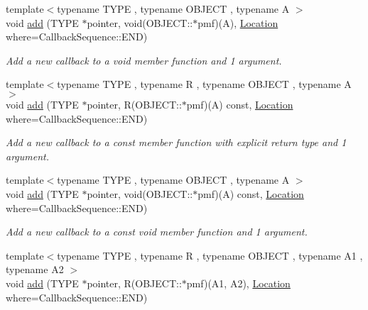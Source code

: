 \begin{DoxyCompactItemize}
{\footnotesize template$<$typename TYPE , typename OBJECT , typename A $>$ }\\void \hyperlink{struct_d_d4hep_1_1_callback_sequence_a193702d2e926545fcd103cab1fb2d37c}{add} (TYPE $\ast$pointer, void(OBJECT::$\ast$pmf)(A), \hyperlink{struct_d_d4hep_1_1_callback_sequence_a7753490247479633aed16a2376821ef7}{Location} where=CallbackSequence::END)
\begin{DoxyCompactList}\small\item\em Add a new callback to a void member function and 1 argument. \item\end{DoxyCompactList}\item 
{\footnotesize template$<$typename TYPE , typename R , typename OBJECT , typename A $>$ }\\void \hyperlink{struct_d_d4hep_1_1_callback_sequence_a1f32b3cb3cfcafe241242a8bbdc55fcf}{add} (TYPE $\ast$pointer, R(OBJECT::$\ast$pmf)(A) const, \hyperlink{struct_d_d4hep_1_1_callback_sequence_a7753490247479633aed16a2376821ef7}{Location} where=CallbackSequence::END)
\begin{DoxyCompactList}\small\item\em Add a new callback to a const member function with explicit return type and 1 argument. \item\end{DoxyCompactList}\item 
{\footnotesize template$<$typename TYPE , typename OBJECT , typename A $>$ }\\void \hyperlink{struct_d_d4hep_1_1_callback_sequence_ac7198c9f6c25ecbbc37d642032d7cf72}{add} (TYPE $\ast$pointer, void(OBJECT::$\ast$pmf)(A) const, \hyperlink{struct_d_d4hep_1_1_callback_sequence_a7753490247479633aed16a2376821ef7}{Location} where=CallbackSequence::END)
\begin{DoxyCompactList}\small\item\em Add a new callback to a const void member function and 1 argument. \item\end{DoxyCompactList}\item 
{\footnotesize template$<$typename TYPE , typename R , typename OBJECT , typename A1 , typename A2 $>$ }\\void \hyperlink{struct_d_d4hep_1_1_callback_sequence_ad73a7b5a1c07c298dbbc62730b945c93}{add} (TYPE $\ast$pointer, R(OBJECT::$\ast$pmf)(A1, A2), \hyperlink{struct_d_d4hep_1_1_callback_sequence_a7753490247479633aed16a2376821ef7}{Location} where=CallbackSequence::END)

\end{DoxyCompactItemize}
